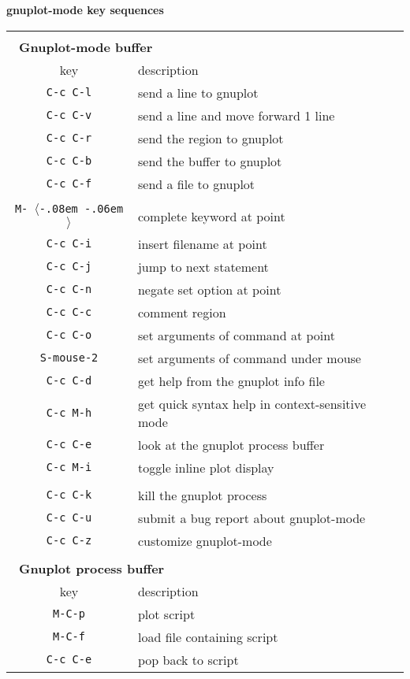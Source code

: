 \documentclass[twocolumn]{article}
\def\key#1{{\textrm \leavevmode\hbox{%
  \raise0.4pt\hbox{$\langle$}\kern-.08em\vtop{%
    \vbox{\hrule\kern-0.4pt
     \hbox{\raise0.4pt\hbox{\vphantom{$\langle$}}#1}}%
    \kern-0.4pt\hrule}%
  \kern-.06em\raise0.4pt\hbox{$\rangle$}}}}
\begin{document}
\begin{minipage}[h]{\linewidth}
  \begin{center}
    \centerline{{\large\textbf{gnuplot-mode key sequences}}}
    \vspace{0.2ex}
    \begin{tabular}[h]{cl}
      \hline \hline
      \\[-1ex]
      \multicolumn{2}{l}{~\quad\textbf{Gnuplot-mode buffer}}\\[0.5ex]
      \textrm{key} & \quad description \\
      \hline
      \texttt{C-c C-l} & send a line to gnuplot \\
      \texttt{C-c C-v} & send a line and move forward 1 line\\
      \texttt{C-c C-r} & send the region to gnuplot \\
      \texttt{C-c C-b} & send the buffer to gnuplot \\
      \texttt{C-c C-f} & send a file to gnuplot \\
      & \\[-1.5ex]
      \texttt{M-\key{tab}} & complete keyword at point \\
      \texttt{C-c C-i} & insert filename at point \\
      \texttt{C-c C-j} & jump to next statement \\
      \texttt{C-c C-n} & negate set option at point \\
      \texttt{C-c C-c} & comment region \\
      \texttt{C-c C-o} & set arguments of command at point \\
      \texttt{S-mouse-2} & set arguments of command under mouse \\
      \texttt{C-c C-d} & get help from the gnuplot info file \\
      \texttt{C-c M-h} & get quick syntax help in context-sensitive mode \\
      \texttt{C-c C-e} & look at the gnuplot process buffer \\
      \texttt{C-c M-i} & toggle inline plot display \\
      & \\[-1.5ex]
      \texttt{C-c C-k} & kill the gnuplot process \\
      \texttt{C-c C-u} & submit a bug report about gnuplot-mode \\
      \texttt{C-c C-z} & customize gnuplot-mode \\
      \hline
      \\[-1ex]
      \multicolumn{2}{l}{~\quad\textbf{Gnuplot process buffer}}\\[0.5ex]
      \textrm{key} & \quad description \\
      \hline
      \texttt{M-C-p}   & plot script \\
      \texttt{M-C-f}   & load file containing script \\
      \texttt{C-c C-e} & pop back to script \\
      \hline \hline
    \end{tabular}
  \end{center}
\end{minipage}
\end{document}
